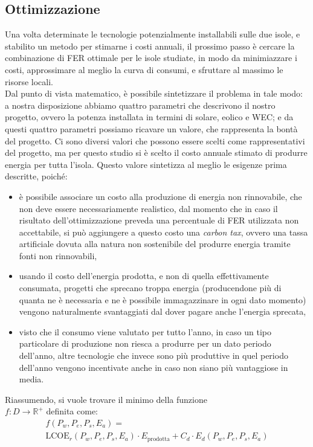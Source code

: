 \documentclass[fleqn,10pt]{SelfArx} %
\begin{document}
\subsection{Ottimizzazione}
Una volta determinate le tecnologie potenzialmente installabili sulle due isole, e stabilito un metodo per stimarne i costi annuali, il prossimo passo è cercare la combinazione di FER ottimale per le isole studiate, in modo da minimiazzare i costi, approssimare al meglio la curva di consumi, e sfruttare al massimo le risorse locali. \\
Dal punto di vista matematico, è possibile sintetizzare il problema in tale modo: a nostra disposizione abbiamo quattro parametri che descrivono il nostro progetto, ovvero la potenza installata in termini di solare, eolico e WEC; e da questi quattro parametri possiamo ricavare un valore, che rappresenta la bontà del progetto.
Ci sono diversi valori che possono essere scelti come rappresentativi del progetto, ma per questo studio si è scelto il costo annuale stimato di produrre energia per tutta l'isola.
Questo valore sintetizza al meglio le esigenze prima descritte, poiché:
\begin{itemize}
	\item è possibile associare un costo alla produzione di energia non rinnovabile, che non deve essere necessariamente realistico, dal momento che in caso il risultato dell'ottimizzazione preveda una percentuale di FER utilizzata non accettabile, si può aggiungere a questo costo una \textit{carbon tax}, ovvero una tassa artificiale dovuta alla natura non sostenibile del produrre energia tramite fonti non rinnovabili,
	\item usando il costo dell'energia prodotta, e non di quella effettivamente consumata, progetti che sprecano troppa energia (producendone più di quanta ne è necessaria e ne è possibile immagazzinare in ogni dato momento) vengono naturalmente svantaggiati dal dover pagare anche l'energia sprecata,
	\item visto che il consumo viene valutato per tutto l'anno, in caso un tipo particolare di produzione non riesca a produrre per un dato periodo dell'anno, altre tecnologie che invece sono più produttive in quel periodo dell'anno vengono incentivate anche in caso non siano più vantaggiose in media. %
\end{itemize}
Riassumendo, si vuole trovare il minimo della funzione \\ $f: D \to \mathbb{R}^+$ definita come:
\begin{equation}
\begin{array}{cl}
	f (P_w, P_e, P_s, E_a) = \\
		\text{LCOE}_r(P_w, P_e, P_s, E_a) \cdot E_\text{prodotta} + C_d \cdot E_d(P_w, P_e, P_s, E_a)
\end{array}
\end{equation}
\end{document}
